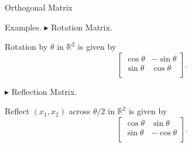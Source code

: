 \documentclass[aspectratio=169, UTF8]{ctexbeamer}
\begin{document}
\begin{frame}{Orthogonal Matrix}

    \begin{block}{Examples.}
        {$\blacktriangleright$ Rotation Matrix.}
        \par Rotation by $\theta$ in $\mathbb{R}^2$ is given by
        \begin{equation*}
            \left[ \begin{array}{cc}
                    \cos \theta & -\sin \theta \\
                    \sin \theta & \cos \theta  \\
                \end{array} \right].
        \end{equation*}

        {$\blacktriangleright$ Reflection Matrix.}
        \par Reflect $(x_1,x_2)$ across $\theta / 2$ in $\mathbb{R}^2$ is given by
        \begin{equation*}
            \left[ \begin{array}{cc}
                    \cos \theta & \sin \theta  \\
                    \sin \theta & -\cos \theta \\
                \end{array} \right].
        \end{equation*}
    \end{block}

\end{frame}
\end{document}
